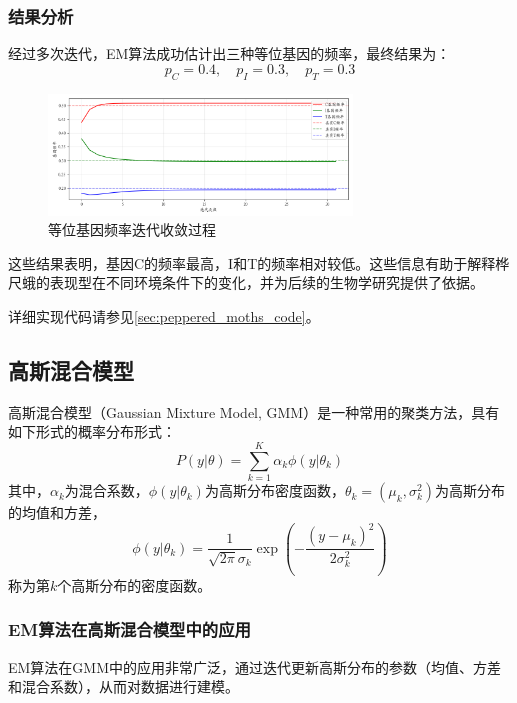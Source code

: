 \documentclass[a4paper,12pt]{ctexart} %
\begin{document}
\subsubsection{结果分析}
经过多次迭代，EM算法成功估计出三种等位基因的频率，最终结果为：
\begin{equation*}
p_C = 0.4, \quad p_I = 0.3, \quad p_T = 0.3
\end{equation*}

\begin{figure}[H]
    \centering
    \includegraphics[width=0.72\textwidth]{fig/蛾迭代.png}
    \caption{等位基因频率迭代收敛过程}
    \label{fig:moth_iteration}
\end{figure}

这些结果表明，基因C的频率最高，I和T的频率相对较低。这些信息有助于解释桦尺蛾的表现型在不同环境条件下的变化，并为后续的生物学研究提供了依据。

详细实现代码请参见\ref{sec:peppered_moths_code}。
\subsection{高斯混合模型}

高斯混合模型（Gaussian Mixture Model, GMM）是一种常用的聚类方法，具有如下形式的概率分布形式：
\begin{equation}
P(y|\theta) = \sum_{k=1}^K \alpha_k \phi(y|\theta_k)
\end{equation}
其中，$\alpha_k$为混合系数，$\phi(y|\theta_k)$为高斯分布密度函数，$\theta_k = (\mu_k,\sigma_k^2)$为高斯分布的均值和方差，
\begin{equation}
\phi(y|\theta_k) = \frac{1}{\sqrt{2\pi}\sigma_k} \exp\left(-\frac{(y-\mu_k)^2}{2\sigma_k^2}\right)
\end{equation}
称为第$k$个高斯分布的密度函数。

\subsubsection{EM算法在高斯混合模型中的应用}
EM算法在GMM中的应用非常广泛，通过迭代更新高斯分布的参数（均值、方差和混合系数），从而对数据进行建模。
\end{document}
